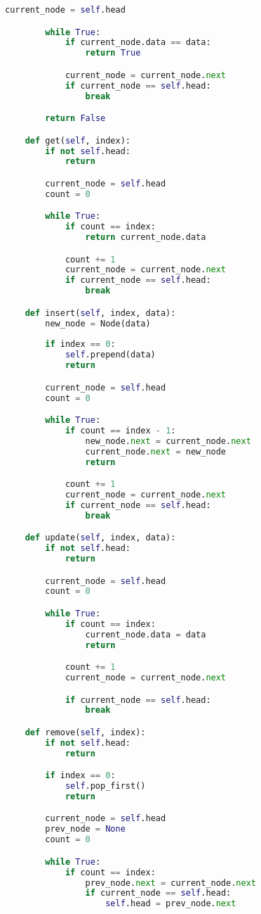 \begin{lstlisting}[language=Python]
        current_node = self.head

        while True:
            if current_node.data == data:
                return True

            current_node = current_node.next
            if current_node == self.head:
                break

        return False

    def get(self, index):
        if not self.head:
            return

        current_node = self.head
        count = 0

        while True:
            if count == index:
                return current_node.data

            count += 1
            current_node = current_node.next
            if current_node == self.head:
                break

    def insert(self, index, data):
        new_node = Node(data)
        
        if index == 0:
            self.prepend(data)
            return

        current_node = self.head
        count = 0

        while True:
            if count == index - 1:
                new_node.next = current_node.next
                current_node.next = new_node
                return

            count += 1
            current_node = current_node.next
            if current_node == self.head:
                break

    def update(self, index, data):
        if not self.head:
            return

        current_node = self.head
        count = 0

        while True:
            if count == index:
                current_node.data = data
                return

            count += 1
            current_node = current_node.next

            if current_node == self.head:
                break

    def remove(self, index):
        if not self.head:
            return

        if index == 0:
            self.pop_first()
            return

        current_node = self.head
        prev_node = None
        count = 0

        while True:
            if count == index:
                prev_node.next = current_node.next
                if current_node == self.head:
                    self.head = prev_node.next


\end{lstlisting}
